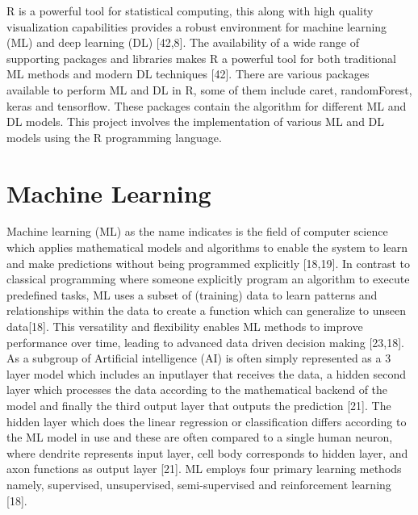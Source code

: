 \documentclass[12pt,a4paper]{report}
\begin{document}
R is a powerful tool for statistical computing, this along with high quality visualization capabilities provides a robust environment for machine learning (ML) and deep learning (DL) [42,8]. The availability of a wide range of supporting packages and libraries makes R a powerful tool for both traditional ML methods and modern DL techniques [42]. There are various packages available to perform ML and DL in R, some of them include caret, randomForest, keras and tensorflow. These packages contain the algorithm for different  ML and DL models. This project involves the implementation of various ML and DL models using the R programming language. \\

\section{Machine Learning}

Machine learning (ML) as the name indicates is the field of computer science which applies mathematical models and algorithms to enable the system to learn and make predictions without being programmed explicitly [18,19]. In contrast to classical programming where someone explicitly program an algorithm to execute predefined tasks,
ML uses a subset of (training) data to learn patterns and relationships within the data to create a function which can generalize to unseen data[18]. This versatility and flexibility enables ML methods to improve performance over time, leading to advanced data driven decision making [23,18]. As a subgroup of Artificial intelligence (AI)
is often simply represented as a 3 layer model which includes an inputlayer that receives the data, a hidden second layer which processes the data according to the mathematical backend of the model and finally the third output layer that outputs the prediction [21]. The hidden layer which does the linear regression or classification differs 
according to the ML model in use and these are often compared to a single human neuron, where dendrite represents input layer, cell body corresponds to hidden layer, and axon functions as output layer [21]. ML employs four primary learning methods namely, supervised, unsupervised, semi-supervised and reinforcement learning [18]. \\
\end{document}
